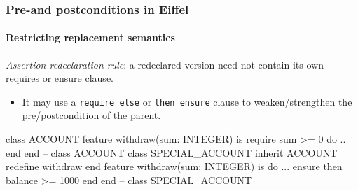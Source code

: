 \documentclass{beamer}
\begin{document}
\begin{frame}[fragile]
\frametitle{Pre-and postconditions in Eiffel}
\framesubtitle{Restricting replacement semantics}
\textit{Assertion redeclaration rule}: a redeclared version need not contain its own requires or ensure
clause.
\begin{itemize}
\item It may use a \texttt{require else} or
\texttt{then ensure} clause
to weaken/strengthen the pre/postcondition of the parent. 

\end{itemize}
\begin{eiffel}
class ACCOUNT 
feature
   withdraw(sum: INTEGER) is
       require
           sum >= 0
       do ..  end
end -- class ACCOUNT
class SPECIAL_ACCOUNT inherit
      ACCOUNT
      redefine withdraw end
feature
       withdraw(sum: INTEGER) is
       do ...
       ensure then
           balance >= 1000
       end
end -- class SPECIAL_ACCOUNT       
\end{eiffel}
\end{frame}
\end{document}
